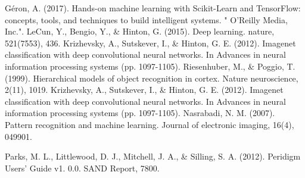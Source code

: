\begin{thebibliography}{}
Géron, A. (2017). Hands-on machine learning with Scikit-Learn and TensorFlow: concepts, tools, and techniques to build intelligent systems. " O'Reilly Media, Inc.".
LeCun, Y., Bengio, Y., \& Hinton, G. (2015). Deep learning. nature, 521(7553), 436.
Krizhevsky, A., Sutskever, I., \& Hinton, G. E. (2012). Imagenet classification with deep convolutional neural networks. In Advances in neural information processing systems (pp. 1097-1105).
Riesenhuber, M., \& Poggio, T. (1999). Hierarchical models of object recognition in cortex. Nature neuroscience, 2(11), 1019.
Krizhevsky, A., Sutskever, I., \& Hinton, G. E. (2012). Imagenet classification with deep convolutional neural networks. In Advances in neural information processing systems (pp. 1097-1105).
Nasrabadi, N. M. (2007). Pattern recognition and machine learning. Journal of electronic imaging, 16(4), 049901.

Parks, M. L., Littlewood, D. J., Mitchell, J. A., \& Silling, S. A. (2012). Peridigm Users’ Guide v1. 0.0. SAND Report, 7800.

\end{thebibliography}





